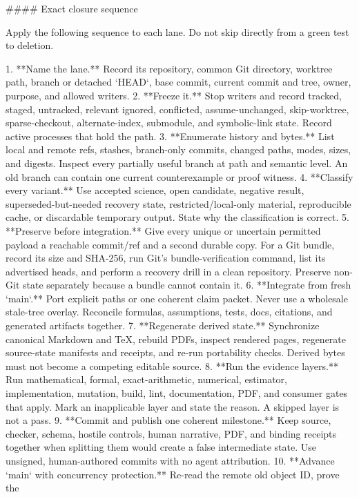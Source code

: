 \documentclass[11pt]{article}
\begin{document}
\begin{markdown}
#### Exact closure sequence

Apply the following sequence to each lane. Do not skip directly from a green test to deletion.

1. **Name the lane.** Record its repository, common Git directory, worktree path, branch or detached
   `HEAD`, base commit, current commit and tree, owner, purpose, and allowed writers.
2. **Freeze it.** Stop writers and record tracked, staged, untracked, relevant ignored, conflicted,
   assume-unchanged, skip-worktree, sparse-checkout, alternate-index, submodule, and symbolic-link
   state. Record active processes that hold the path.
3. **Enumerate history and bytes.** List local and remote refs, stashes, branch-only commits,
   changed paths, modes, sizes, and digests. Inspect every partially useful branch at path and
   semantic level. An old branch can contain one current counterexample or proof witness.
4. **Classify every variant.** Use accepted science, open candidate, negative result,
   superseded-but-needed recovery state, restricted/local-only material, reproducible cache, or
   discardable temporary output. State why the classification is correct.
5. **Preserve before integration.** Give every unique or uncertain permitted payload a reachable
   commit/ref and a second durable copy. For a Git bundle, record its size and SHA-256, run
   Git's bundle-verification command, list its advertised heads, and perform a recovery drill in a clean
   repository. Preserve non-Git state separately because a bundle cannot contain it.
6. **Integrate from fresh `main`.** Port explicit paths or one coherent claim packet. Never use a
   wholesale stale-tree overlay. Reconcile formulas, assumptions, tests, docs, citations, and
   generated artifacts together.
7. **Regenerate derived state.** Synchronize canonical Markdown and TeX, rebuild PDFs, inspect
   rendered pages, regenerate source-state manifests and receipts, and re-run portability checks.
   Derived bytes must not become a competing editable source.
8. **Run the evidence layers.** Run mathematical, formal, exact-arithmetic, numerical, estimator,
   implementation, mutation, build, lint, documentation, PDF, and consumer gates that apply. Mark
   an inapplicable layer and state the reason. A skipped layer is not a pass.
9. **Commit and publish one coherent milestone.** Keep source, checker, schema, hostile controls,
   human narrative, PDF, and binding receipts together when splitting them would create a false
   intermediate state. Use unsigned, human-authored commits with no agent attribution.
10. **Advance `main` with concurrency protection.** Re-read the remote old object ID, prove the

\end{markdown}
\end{document}
